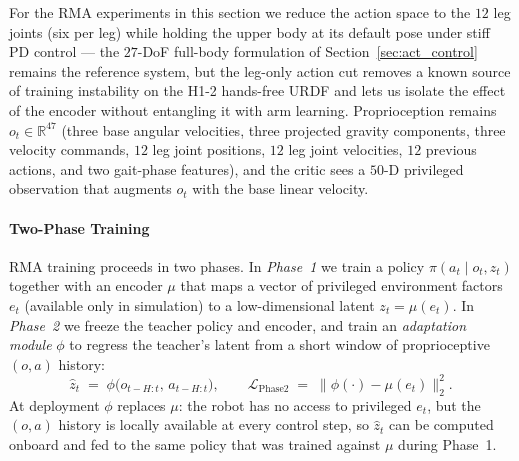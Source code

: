 For the RMA experiments in this section we reduce the action space to the
$12$ leg joints (six per leg) while holding the upper body at its default
pose under stiff PD control --- the $27$-DoF full-body formulation of
Section~\ref{sec:act_control} remains the reference system, but the leg-only
action cut removes a known source of training instability on the H1-2
hands-free URDF and lets us isolate the effect of the encoder without
entangling it with arm learning. Proprioception remains $o_t\in\mathbb{R}^{47}$
(three base angular velocities, three projected gravity components, three
velocity commands, $12$ leg joint positions, $12$ leg joint velocities,
$12$ previous actions, and two gait-phase features), and the critic sees
a $50$-D privileged observation that augments $o_t$ with the base linear
velocity.

\paragraph{Two-Phase Training}
\label{sec:rma_phases}
RMA training proceeds in two phases. In \emph{Phase~1} we train a policy
$\pi(a_t \mid o_t, z_t)$ together with an encoder $\mu$ that maps a vector of
privileged environment factors $e_t$ (available only in simulation) to a
low-dimensional latent $z_t = \mu(e_t)$. In \emph{Phase~2} we freeze the
teacher policy and encoder, and train an \emph{adaptation module} $\phi$ to
regress the teacher's latent from a short window of proprioceptive
$(o, a)$ history:
\[
\hat z_t \;=\; \phi\!\big(o_{t-H:t},\,a_{t-H:t}\big),
\qquad
\mathcal{L}_{\mathrm{Phase 2}} \;=\; \big\|\phi(\cdot)-\mu(e_t)\big\|_2^{2}.
\]
At deployment $\phi$ replaces $\mu$: the robot has no access to privileged
$e_t$, but the $(o, a)$ history is locally available at every control step,
so $\hat z_t$ can be computed onboard and fed to the same policy that was
trained against $\mu$ during Phase~1.

